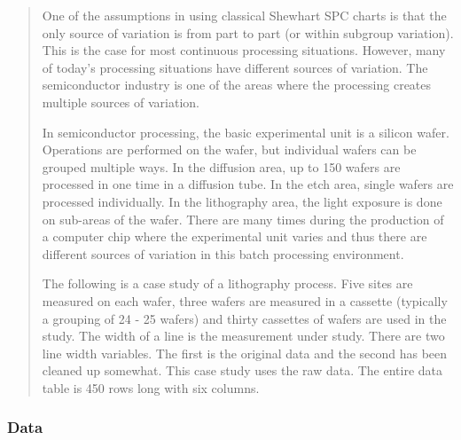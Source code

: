 \documentclass[]{book}
\newenvironment{Shaded}{\begin{snugshade}}{\end{snugshade}}
\newcommand{\DataTypeTok}[1]{\textcolor[rgb]{0.13,0.29,0.53}{#1}}
\newcommand{\DecValTok}[1]{\textcolor[rgb]{0.00,0.00,0.81}{#1}}
\newcommand{\KeywordTok}[1]{\textcolor[rgb]{0.13,0.29,0.53}{\textbf{#1}}}
\newcommand{\NormalTok}[1]{#1}
\newcommand{\OperatorTok}[1]{\textcolor[rgb]{0.81,0.36,0.00}{\textbf{#1}}}
\newcommand{\OtherTok}[1]{\textcolor[rgb]{0.56,0.35,0.01}{#1}}
\newcommand{\StringTok}[1]{\textcolor[rgb]{0.31,0.60,0.02}{#1}}
\theoremstyle{definition}
\theoremstyle{definition}
\theoremstyle{definition}
\theoremstyle{remark}
\begin{document}
\begin{quote}
One of the assumptions in using classical Shewhart SPC charts is that
the only source of variation is from part to part (or within subgroup
variation). This is the case for most continuous processing situations.
However, many of today's processing situations have different sources of
variation. The semiconductor industry is one of the areas where the
processing creates multiple sources of variation.

In semiconductor processing, the basic experimental unit is a silicon
wafer. Operations are performed on the wafer, but individual wafers can
be grouped multiple ways. In the diffusion area, up to 150 wafers are
processed in one time in a diffusion tube. In the etch area, single
wafers are processed individually. In the lithography area, the light
exposure is done on sub-areas of the wafer. There are many times during
the production of a computer chip where the experimental unit varies and
thus there are different sources of variation in this batch processing
environment.

The following is a case study of a lithography process. Five sites are
measured on each wafer, three wafers are measured in a cassette
(typically a grouping of 24 - 25 wafers) and thirty cassettes of wafers
are used in the study. The width of a line is the measurement under
study. There are two line width variables. The first is the original
data and the second has been cleaned up somewhat. This case study uses
the raw data. The entire data table is 450 rows long with six columns.
\end{quote}

\hypertarget{data-1}{%
\subsubsection{Data}\label{data-1}}

\begin{Shaded}
\end{Shaded}
\end{document}
